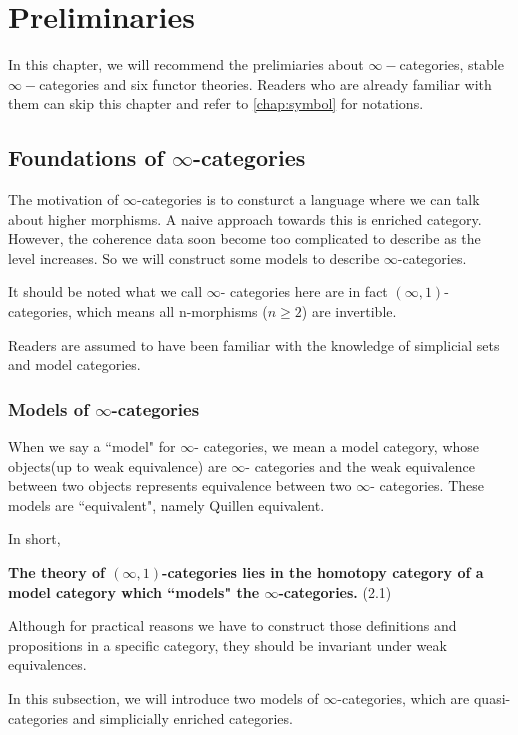 
\chapter{Preliminaries}

In this chapter, we will recommend the prelimiaries about $\infty-$categories, stable $\infty-$categories and six functor theories. Readers who are already familiar with them can skip this chapter and refer to \ref{chap:symbol} for notations.

\section{Foundations of $\infty$-categories}
The motivation of $\infty$-categories is to consturct a language where we can talk about higher morphisms. A naive approach towards this is enriched category. However, the coherence data soon become too complicated to describe as the level increases. So we will construct some models to describe $\infty$-categories.

It should be noted what we call $\infty$- categories here are in fact $(\infty,1)$-categories, which means all n-morphisms ($n \geq 2$) are invertible.

Readers are assumed to have been familiar with the knowledge of simplicial sets and model categories.

\subsection{Models of $\infty$-categories}
When we say a ``model" for $\infty$- categories, we mean a model category, whose objects(up to weak equivalence) are $\infty$- categories and the weak equivalence between two objects represents equivalence between two $\infty$- categories. These models are ``equivalent", namely Quillen equivalent.

In short, 


    \textbf{The theory of $(\infty,1)$-categories lies in the homotopy category of a model category which ``models" the $\infty$-categories.} \label{homocat} \hfill (2.1)



 Although for practical reasons we have to construct those definitions and propositions in a specific category, they should be invariant under weak equivalences.

In this subsection, we will introduce two models of $\infty$-categories, which are quasi-categories and simplicially enriched categories.

